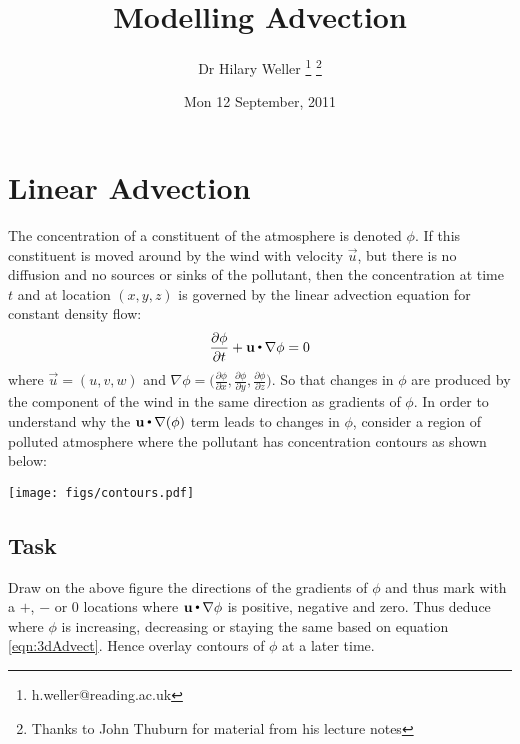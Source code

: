 



\title{Modelling Advection}
\author{Dr Hilary Weller \thanks{\rm{h.weller@reading.ac.uk}}
\thanks{Thanks to John Thuburn for material from his lecture notes}}
\date{Mon 12 September, 2011}
\maketitle

\section{Linear Advection}

The concentration of a constituent of the atmosphere is denoted $\phi$. If this constituent is moved around by the wind with velocity $\vec{u}$, but there is no diffusion and no sources or sinks of the pollutant, then the concentration at time $t$ and at location $(x,y,z)$ is governed by the linear advection equation for constant density flow:
\begin{equation}
\frac{\partial\phi}{\partial t} + \mathbf u\,{\scriptscriptstyle \stackrel{\bullet}{{}}}\,\nabla\phi = 0
\label{eqn:3dAdvect}
\end{equation}
where $\vec{u}=(u,v,w)$ and $\nabla\phi=\bigl(\frac{\partial\phi}{\partial x},\frac{\partial\phi}{\partial y},\frac{\partial\phi}{\partial z}\bigr)$. 
So that changes in $\phi$ are produced by the component of the wind in the same direction as gradients of $\phi$. In order to understand why the $\mathbf u\,{\scriptscriptstyle \stackrel{\bullet}{{}}}\,\nabla(\phi)$ term leads to changes in $\phi$, consider a region of polluted atmosphere where the pollutant has concentration contours as shown below:

\begin{center}
\texttt{[image: figs/contours.pdf]}
\end{center}

\begin{center}\begin{minipage}{0.9\linewidth}
\subsection{Task}
Draw on the above figure the directions of the gradients of $\phi$ and thus mark with a $+$, $-$ or $0$ locations where $\mathbf u\,{\scriptscriptstyle \stackrel{\bullet}{{}}}\,\nabla\phi$ is positive, negative and zero. Thus deduce where $\phi$ is increasing, decreasing or staying the same based on equation \ref{eqn:3dAdvect}. Hence overlay contours of $\phi$ at a later time.
\end{minipage}\end{center}


